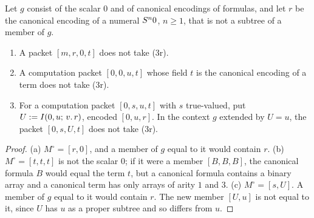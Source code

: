 \begin{lemma}[No collision]\label{cert:lem:collision}
Let $g$ consist of the scalar $0$ and of canonical encodings of formulas, and
let $r$ be the canonical encoding of a numeral $S^n0$, $n\ge1$, that is not
a subtree of a member of $g$.
\begin{enumerate}[label=(\alph*)]
\item A packet $[m,r,0,t]$ does not take (3r).
\item A computation packet $[0,0,u,t]$ whose field $t$ is the canonical
encoding of a term does not take (3r).
\item For a computation packet $[0,s,u,t]$ with $s$ true-valued, put
$U\mathrel{:=}I(0,u;\,v.\,r)$, encoded $[0,u,r]$. In the context $g$ extended by
$U=u$, the packet $[0,s,U,t]$ does not take (3r).
\end{enumerate}
\end{lemma}
\begin{proof}
(a) $M^{\circ}=[r,0]$, and a member of $g$ equal to it would contain $r$.
(b) $M^{\circ}=[t,t,t]$ is not the scalar $0$; if it were a member $[B,B,B]$,
the canonical formula $B$ would equal the term $t$, but a canonical formula
contains a binary array and a canonical term has only arrays of arity $1$ and
$3$. (c) $M^{\circ}=[s,U]$. A member of $g$ equal to it would contain $r$. The
new member $[U,u]$ is not equal to it, since $U$ has $u$ as a proper subtree
and so differs from $u$.
\end{proof}

